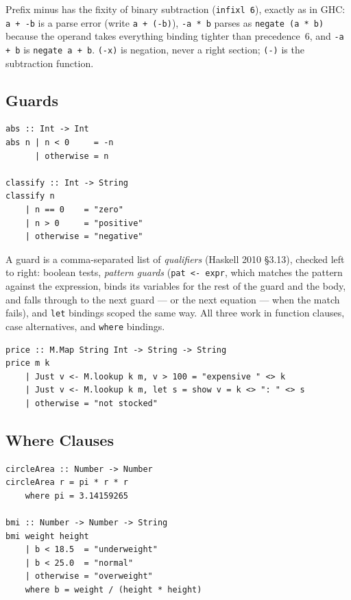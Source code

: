\documentclass[11pt,a4paper]{article}
\begin{document}
Prefix minus has the fixity of binary subtraction (\texttt{infixl 6}),
exactly as in GHC: \texttt{a + -b} is a parse error (write
\texttt{a + (-b)}), \texttt{-a * b} parses as \texttt{negate (a * b)}
because the operand takes everything binding tighter than precedence~6,
and \texttt{-a + b} is \texttt{negate a + b}. \texttt{(-x)} is negation,
never a right section; \texttt{(-)} is the subtraction function.

\subsection{Guards}

\begin{lstlisting}
abs :: Int -> Int
abs n | n < 0     = -n
      | otherwise = n

classify :: Int -> String
classify n
    | n == 0    = "zero"
    | n > 0     = "positive"
    | otherwise = "negative"
\end{lstlisting}

A guard is a comma-separated list of \emph{qualifiers} (Haskell 2010
\S3.13), checked left to right: boolean tests, \emph{pattern guards}
(\texttt{pat <- expr}, which matches the pattern against the expression,
binds its variables for the rest of the guard and the body, and falls
through to the next guard --- or the next equation --- when the match
fails), and \texttt{let} bindings scoped the same way. All three work in
function clauses, case alternatives, and \texttt{where} bindings.

\begin{lstlisting}
price :: M.Map String Int -> String -> String
price m k
    | Just v <- M.lookup k m, v > 100 = "expensive " <> k
    | Just v <- M.lookup k m, let s = show v = k <> ": " <> s
    | otherwise = "not stocked"
\end{lstlisting}

\subsection{Where Clauses}

\begin{lstlisting}
circleArea :: Number -> Number
circleArea r = pi * r * r
    where pi = 3.14159265

bmi :: Number -> Number -> String
bmi weight height
    | b < 18.5  = "underweight"
    | b < 25.0  = "normal"
    | otherwise = "overweight"
    where b = weight / (height * height)
\end{lstlisting}
\end{document}
